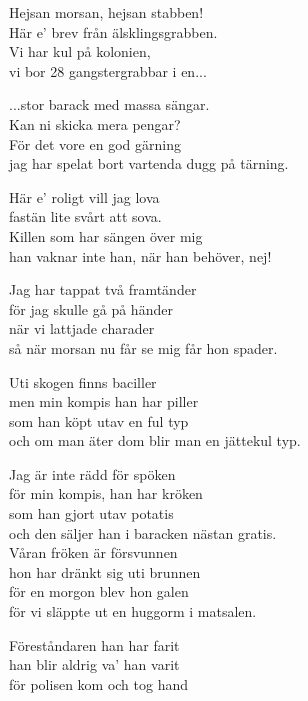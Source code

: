 \vspace{10pt}
Hejsan morsan, hejsan stabben!\\
Här e' brev från älsklingsgrabben.\\
Vi har kul på kolonien,\\
vi bor 28 gangstergrabbar i en...\par
\vspace{10pt}
...stor barack med massa sängar.\\
Kan ni skicka mera pengar?\\
För det vore en god gärning\\
jag har spelat bort vartenda dugg på tärning.\par
\vspace{10pt}
Här e' roligt vill jag lova\\
fastän lite svårt att sova.\\
Killen som har sängen över mig\\
han vaknar inte han, när han behöver, nej!\par
\vspace{10pt}
Jag har tappat två framtänder\\
för jag skulle gå på händer\\
när vi lattjade charader\\
så när morsan nu får se mig får hon spader.\par
\vspace{10pt}
Uti skogen finns baciller\\
men min kompis han har piller\\
som han köpt utav en ful typ\\
och om man äter dom blir man en jättekul typ.\par
\newpage
Jag är inte rädd för spöken\\
för min kompis, han har kröken\\
som han gjort utav potatis\\
och den säljer han i baracken nästan gratis.\\
Våran fröken är försvunnen\\
hon har dränkt sig uti brunnen\\
för en morgon blev hon galen\\
för vi släppte ut en huggorm i matsalen.\par
\vspace{10pt}
Föreståndaren han har farit\\
han blir aldrig va' han varit\\
för polisen kom och tog hand\\
